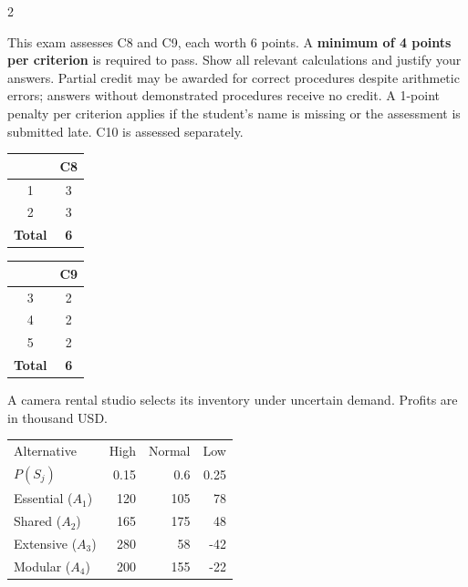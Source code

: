	\begin{multicols}{2}
		\raggedcolumns
		
		This exam assesses C8 and C9, each worth 6 points. A \textbf{minimum of 4 points per criterion} is required to pass. Show all relevant calculations and justify your answers. Partial credit may be awarded for correct procedures despite arithmetic errors; answers without demonstrated procedures receive no credit. A 1-point penalty per criterion applies if the student's name is missing or the assessment is submitted late. C10 is assessed separately.
		
		\vspace{-7mm}
		\begin{center}
			\begin{tabular}{|c|c|}
				\hline
				\textbf{\textnumero} & \textbf{C8} \\ \hline
				1 & 3 \\ \hline
				2 & 3 \\ \hline
				\textbf{Total} & \textbf{6} \\ \hline
			\end{tabular}
			\hspace{1cm}
			\begin{tabular}{|c|c|}
				\hline
				\textbf{\textnumero} & \textbf{C9} \\ \hline
				3 & 2 \\ \hline
				4 & 2 \\ \hline
				5 & 2 \\ \hline
				\textbf{Total} & \textbf{6} \\ \hline
			\end{tabular}
		\end{center}
		\vspace{-4mm}
		
		
A camera rental studio selects its inventory under uncertain demand. Profits are in thousand USD.

\vspace{-3mm}
\begin{center}\small\setlength{\tabcolsep}{4pt}
	\begin{tabular}{lrrr}\toprule
		Alternative & High & Normal & Low\\
		$P(S_j)$ & 0.15 & 0.6 & 0.25\\ \midrule
				Essential ($A_1$) & 120 & 105 & 78\\
		Shared ($A_2$) & 165 & 175 & 48\\
		Extensive ($A_3$) & 280 & 58 & -42\\
		Modular ($A_4$) & 200 & 155 & -22\\
		\bottomrule
	\end{tabular}
\end{center} \vspace*{-3mm}


\end{multicols}
